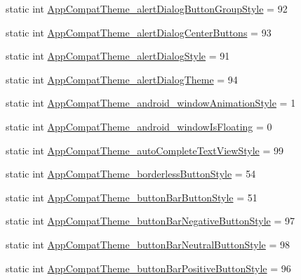 \begin{DoxyCompactItemize}
\item 
static int \hyperlink{classandroid_1_1support_1_1v7_1_1mediarouter_1_1R_1_1styleable_a3a3facde74bdd9f3ab7535e69a8b2bab}{App\+Compat\+Theme\+\_\+alert\+Dialog\+Button\+Group\+Style} = 92
\item 
static int \hyperlink{classandroid_1_1support_1_1v7_1_1mediarouter_1_1R_1_1styleable_abcca492d47ce112a675f207ef0498cf8}{App\+Compat\+Theme\+\_\+alert\+Dialog\+Center\+Buttons} = 93
\item 
static int \hyperlink{classandroid_1_1support_1_1v7_1_1mediarouter_1_1R_1_1styleable_aa0353bad7ae900c7e85a37565a5fb265}{App\+Compat\+Theme\+\_\+alert\+Dialog\+Style} = 91
\item 
static int \hyperlink{classandroid_1_1support_1_1v7_1_1mediarouter_1_1R_1_1styleable_a2053a143324d9fce095f3e158a2ec295}{App\+Compat\+Theme\+\_\+alert\+Dialog\+Theme} = 94
\item 
static int \hyperlink{classandroid_1_1support_1_1v7_1_1mediarouter_1_1R_1_1styleable_a09c1f30862ae9d1ce8431309e49a7d43}{App\+Compat\+Theme\+\_\+android\+\_\+window\+Animation\+Style} = 1
\item 
static int \hyperlink{classandroid_1_1support_1_1v7_1_1mediarouter_1_1R_1_1styleable_aa1cdfff61dbd73fcb80e68bc2f4f7417}{App\+Compat\+Theme\+\_\+android\+\_\+window\+Is\+Floating} = 0
\item 
static int \hyperlink{classandroid_1_1support_1_1v7_1_1mediarouter_1_1R_1_1styleable_a21b934ac6667c4b9a8b9c730d467e140}{App\+Compat\+Theme\+\_\+auto\+Complete\+Text\+View\+Style} = 99
\item 
static int \hyperlink{classandroid_1_1support_1_1v7_1_1mediarouter_1_1R_1_1styleable_a8a952ea02e2851785b478be273bb3224}{App\+Compat\+Theme\+\_\+borderless\+Button\+Style} = 54
\item 
static int \hyperlink{classandroid_1_1support_1_1v7_1_1mediarouter_1_1R_1_1styleable_ad20f3db7aa5369c7dcfc5bd51371b85a}{App\+Compat\+Theme\+\_\+button\+Bar\+Button\+Style} = 51
\item 
static int \hyperlink{classandroid_1_1support_1_1v7_1_1mediarouter_1_1R_1_1styleable_a5149daf27bddf85d912f992f8fa8acd1}{App\+Compat\+Theme\+\_\+button\+Bar\+Negative\+Button\+Style} = 97
\item 
static int \hyperlink{classandroid_1_1support_1_1v7_1_1mediarouter_1_1R_1_1styleable_aff182cdd74b6dce4c8c16447cb6760e6}{App\+Compat\+Theme\+\_\+button\+Bar\+Neutral\+Button\+Style} = 98
\item 
static int \hyperlink{classandroid_1_1support_1_1v7_1_1mediarouter_1_1R_1_1styleable_a43d9a32374dba702819c4ec6c05ab691}{App\+Compat\+Theme\+\_\+button\+Bar\+Positive\+Button\+Style} = 96

\end{DoxyCompactItemize}
